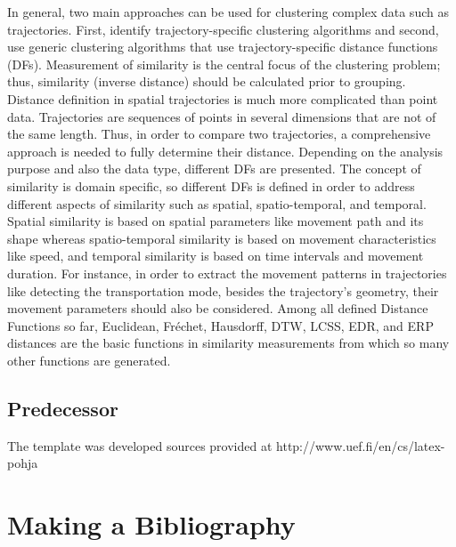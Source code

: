 \documentclass[a4paper, 12pt]{article}
\begin{document}
In general, two main approaches can be used for clustering complex data such as trajectories. First, identify trajectory-specific clustering algorithms and second, use generic clustering algorithms that use trajectory-specific distance functions (DFs). Measurement of similarity is the central focus of the clustering problem; thus, similarity (inverse distance) should be calculated prior to grouping. Distance definition in spatial trajectories is much more complicated than point data. Trajectories are sequences of points in several dimensions that are not of the same length. Thus, in order to compare two trajectories, a comprehensive approach is needed to fully determine their distance. Depending on the analysis purpose and also the data type, different DFs are presented. The concept of similarity is domain specific, so different DFs is defined in order to address different aspects of similarity such as spatial, spatio-temporal, and temporal. Spatial similarity is based on spatial parameters like movement path and its shape whereas spatio-temporal similarity is based on movement characteristics like speed, and temporal similarity is based on time intervals and movement duration. For instance, in order to extract the movement patterns in trajectories like detecting the transportation mode, besides the trajectory’s geometry, their movement parameters should also be considered. Among all defined Distance Functions so far, Euclidean, Fréchet, Hausdorff, DTW, LCSS, EDR, and ERP distances are the basic functions in similarity measurements from which so many other functions are generated.

\subsection{Predecessor}

The template was developed sources provided at http://www.uef.fi/en/cs/latex-pohja

\section{Making a Bibliography}


\begin{lstlisting}[frame=single, columns=fullflexible, basicstyle=\ttfamily]

\end{lstlisting}


\end{document}
